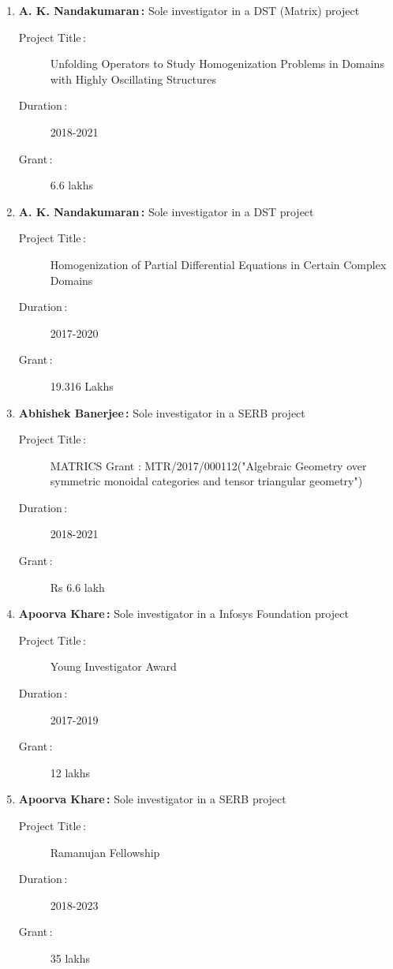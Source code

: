 \begin{enumerate}

\item {\bf A. K. Nandakumaran\,:} Sole investigator in a DST (Matrix) project
\begin{description}
  \item[Project Title\,:] Unfolding Operators to Study Homogenization Problems in Domains with Highly Oscillating Structures
  \item[Duration\,:] 2018-2021
  \item[Grant\,:] 6.6 lakhs
\end{description}


\item {\bf A. K. Nandakumaran\,:} Sole investigator in a DST project
\begin{description}
  \item[Project Title\,:] Homogenization of Partial Differential Equations in Certain Complex Domains
  \item[Duration\,:] 2017-2020
  \item[Grant\,:] 19.316 Lakhs
\end{description}


\item {\bf Abhishek Banerjee\,:} Sole investigator in a SERB project
\begin{description}
  \item[Project Title\,:] MATRICS Grant : MTR/2017/000112("Algebraic Geometry over symmetric monoidal categories and tensor triangular geometry")
  \item[Duration\,:] 2018-2021
  \item[Grant\,:] Rs 6.6 lakh
\end{description}


\item {\bf Apoorva Khare\,:} Sole investigator in a Infosys Foundation project
\begin{description}
  \item[Project Title\,:] Young Investigator Award
  \item[Duration\,:] 2017-2019
  \item[Grant\,:] 12 lakhs
\end{description}


\item {\bf Apoorva Khare\,:} Sole investigator in a SERB project
\begin{description}
  \item[Project Title\,:] Ramanujan Fellowship
  \item[Duration\,:] 2018-2023
  \item[Grant\,:] 35 lakhs
\end{description}



\end{enumerate}
